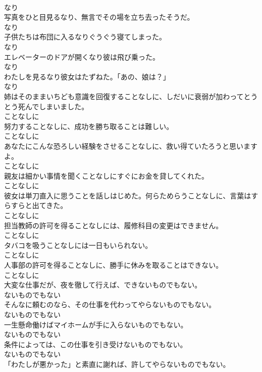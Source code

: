 \documentclass[8pt]{extreport}
\begin{document}
\begin{CJK}{UTF8}{min}
\\	なり
\\	写真をひと目見るなり、無言でその場を立ち去ったそうだ。	
\\	なり
\\	子供たちは布団に入るなりぐうぐう寝てしまった。	
\\	なり
\\	エレベーターのドアが開くなり彼は飛び乗った。	
\\	なり
\\	わたしを見るなり彼女はたずねた。「あの、娘は？」	
\\	なり
\\	姉はそのままいちども意識を回復することなしに、しだいに衰弱が加わってとうとう死んでしまいました。	
\\	ことなしに
\\	努力することなしに、成功を勝ち取ることは難しい。	
\\	ことなしに
\\	あなたにこんな恐ろしい経験をさせることなしに、救い得ていたろうと思いますよ。	
\\	ことなしに
\\	親友は細かい事情を聞くことなしにすぐにお金を貸してくれた。	
\\	ことなしに
\\	彼女は単刀直入に思うことを話しはじめた。何らためらうことなしに、言葉はすらすらと出てきた。	
\\	ことなしに
\\	担当教師の許可を得ることなしには、履修科目の変更はできません。	
\\	ことなしに
\\	タバコを吸うことなしには一日もいられない。	
\\	ことなしに
\\	人事部の許可を得ることなしに、勝手に休みを取ることはできない。	
\\	ことなしに
\\	大変な仕事だが、夜を徹して行えば、できないものでもない。	
\\	ないものでもない
\\	そんなに頼むのなら、その仕事を代わってやらないものでもない。	
\\	ないものでもない
\\	一生懸命働けばマイホームが手に入らないものでもない。	
\\	ないものでもない
\\	条件によっては、この仕事を引き受けないものでもない。	
\\	ないものでもない
\\	「わたしが悪かった」と素直に謝れば、許してやらないものでもない。	

\end{CJK}
\end{document}
